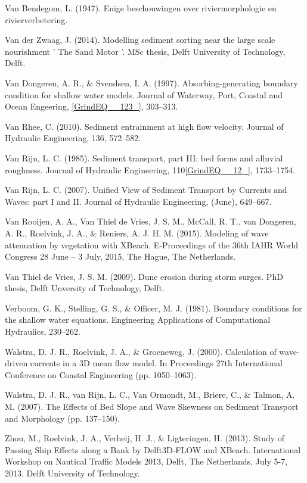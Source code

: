 \documentclass{article}
\begin{document}
\noindent Van Bendegom, L. (1947). Enige beschouwingen over riviermorphologie en rivierverbetering.

\noindent Van der Zwaag, J. (2014). Modelling sediment sorting near the large scale nourishment ' The Sand Motor '. MSc thesis, Delft University of Technology, Delft.

\noindent Van Dongeren, A. R., \& Svendsen, I. A. (1997). Absorbing-generating boundary condition for shallow water models. Journal of Waterway, Port, Coastal and Ocean Engeering, \eqref{GrindEQ__123_}, 303--313.

\noindent Van Rhee, C. (2010). Sediment entrainment at high flow velocity. Journal of Hydraulic Engineering, 136, 572--582.

\noindent Van Rijn, L. C. (1985). Sediment transport, part III: bed forms and alluvial roughness. Journal of Hydraulic Engineering, 110\eqref{GrindEQ__12_}, 1733--1754.

\noindent Van Rijn, L. C. (2007). Unified View of Sediment Transport by Currents and Waves: part I and II. Journal of Hydraulic Engineering, (June), 649--667.

\noindent Van Rooijen, A. A., Van Thiel de Vries, J. S. M., McCall, R. T., van Dongeren, A. R., Roelvink, J. A., \& Reniers, A. J. H. M. (2015). Modeling of wave attenuation by vegetation with XBeach. E-Proceedings of the 36th IAHR World Congress 28 June -- 3 July, 2015, The Hague, The Netherlands.

\noindent Van Thiel de Vries, J. S. M. (2009). Dune erosion during storm surges. PhD thesis, Delft Unversity of Technology, Delft.

\noindent Verboom, G. K., Stelling, G. S., \& Officer, M. J. (1981). Boundary conditions for the shallow water equations. Engineering Applications of Computational Hydraulics, 230--262.

\noindent Walstra, D. J. R., Roelvink, J. A., \& Groeneweg, J. (2000). Calculation of wave-driven currents in a 3D mean flow model. In Proceedings 27th International Conference on Coastal Engineering (pp. 1050--1063).

\noindent Walstra, D. J. R., van Rijn, L. C., Van Ormondt, M., Briere, C., \& Talmon, A. M. (2007). The Effects of Bed Slope and Wave Skewness on Sediment Transport and Morphology (pp. 137--150).

\noindent Zhou, M., Roelvink, J. A., Verheij, H. J., \& Ligteringen, H. (2013). Study of Passing Ship Effects along a Bank by Delft3D-FLOW and XBeach. International Workshop on Nautical Traffic Models 2013, Delft, The Netherlands, July 5-7, 2013. Delft University of Technology.
\end{document}

